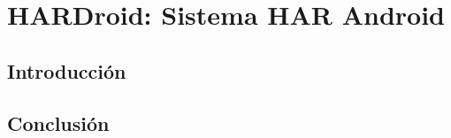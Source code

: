 
\chapter{HARDroid: Sistema HAR Android}

\label{chap5:hardroid}

\section{Introducción}

\section{Conclusión}
